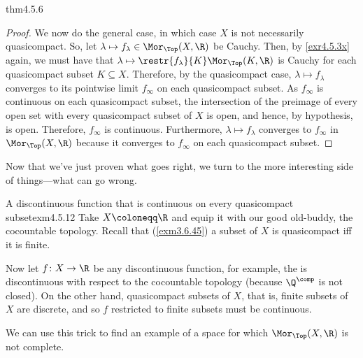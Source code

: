 \begin{thm}{}{thm4.5.6}
\begin{proof}
We now do the general case, in which case $X$ is not necessarily quasicompact.  So, let $\lambda \mapsto f_\lambda \in \Mor _{\Top}(X,\R )$ be Cauchy.  Then, by \cref{exr4.5.3x} again, we must have that $\lambda \mapsto \restr{f_\lambda}{K}\Mor _{\Top}(K,\R )$ is Cauchy for each quasicompact subset $K\subseteq X$.  Therefore, by the quasicompact case, $\lambda \mapsto f_\lambda$ converges to its pointwise limit $f_\infty$ on each quasicompact subset.  As $f_\infty$ is continuous on each quasicompact subset, the intersection of the preimage of every open set with every quasicompact subset of $X$ is open, and hence, by hypothesis, is open.  Therefore, $f_\infty$ is continuous.  Furthermore, $\lambda \mapsto f_\lambda$ converges to $f_\infty$ in $\Mor _{\Top}(X,\R )$ because it converges to $f_\infty$ on each quasicompact subset.
\end{proof}
\end{thm}
Now that we've just proven what goes right, we turn to the more interesting side of things---what can go wrong.
\begin{exm}{A discontinuous function that is continuous on every quasicompact subset}{exm4.5.12}
Take $X\coloneqq \R$ and equip it with our good old-buddy, the cocountable topology.  Recall that (\cref{exm3.6.45}) a subset of $X$ is quasicompact iff it is finite.

Now let $f\colon X\rightarrow \R$ be any discontinuous function, for example, the  is discontinuous with respect to the cocountable topology (because $\Q ^{\comp}$ is not closed).  On the other hand, quasicompact subsets of $X$, that is, finite subsets of $X$ are discrete, and so $f$ restricted to finite subsets must be continuous.
\end{exm}
We can use this trick to find an example of a space for which $\Mor _{\Top}(X,\R )$ is not complete.
